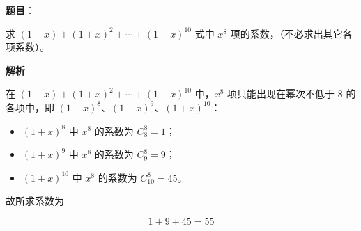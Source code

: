 \begin{answer}

\textbf{题目}：

求 $(1+x)+(1+x)^2+\cdots+(1+x)^{10}$ 式中 $x^8$ 项的系数，（不必求出其它各项系数）。

\textbf{解析}

在 $(1+x)+(1+x)^2+\cdots+(1+x)^{10}$ 中，$x^8$ 项只能出现在幂次不低于 $8$ 的各项中，即 $(1+x)^8$、$(1+x)^9$、$(1+x)^{10}$：

\begin{itemize}
\item $(1+x)^8$ 中 $x^8$ 的系数为 $C_8^8=1$；
\item $(1+x)^9$ 中 $x^8$ 的系数为 $C_9^8=9$；
\item $(1+x)^{10}$ 中 $x^8$ 的系数为 $C_{10}^8=45$。
\end{itemize}

故所求系数为

\nopagebreak[4]
\[
1+9+45=55
\]


\end{answer}
